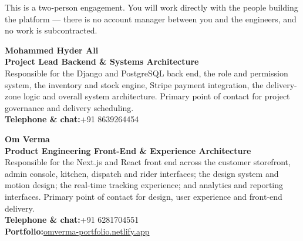 \documentclass[11pt,a4paper]{article}
\begin{document}
This is a two-person engagement. You will work directly with the people building the
platform --- there is no account manager between you and the engineers, and no work is
subcontracted.

\vspace{10pt}

\begin{tcolorbox}[enhanced,colback=brandlight,colframe=brandnavy,boxrule=0pt,leftrule=3.5pt,
  arc=0pt,outer arc=0pt,left=16pt,right=16pt,top=13pt,bottom=13pt]
{\sffamily\bfseries\color{brandnavy}\Large Mohammed Hyder Ali}\\[1pt]
{\sffamily\bfseries\color{brandaccent}Project Lead \textperiodcentered{} Backend \& Systems Architecture}\\[7pt]
Responsible for the Django and PostgreSQL back end, the role and permission system, the
inventory and stock engine, Stripe payment integration, the delivery-zone logic and
overall system architecture. Primary point of contact for project governance and
delivery scheduling.\\[8pt]
{\sffamily\bfseries\color{brandnavy}Telephone \& chat:}\quad +91 8639264454
\end{tcolorbox}

\vspace{10pt}

\begin{tcolorbox}[enhanced,colback=brandlight,colframe=brandnavy,boxrule=0pt,leftrule=3.5pt,
  arc=0pt,outer arc=0pt,left=16pt,right=16pt,top=13pt,bottom=13pt]
{\sffamily\bfseries\color{brandnavy}\Large Om Verma}\\[1pt]
{\sffamily\bfseries\color{brandaccent}Product Engineering \textperiodcentered{} Front-End \& Experience Architecture}\\[7pt]
Responsible for the Next.js and React front end across the customer storefront, admin
console, kitchen, dispatch and rider interfaces; the design system and motion design; the
real-time tracking experience; and analytics and reporting interfaces. Primary point of
contact for design, user experience and front-end delivery.\\[8pt]
{\sffamily\bfseries\color{brandnavy}Telephone \& chat:}\quad +91 6281704551\\[3pt]
{\sffamily\bfseries\color{brandnavy}Portfolio:}\quad \href{https://omverma-portfolio.netlify.app/}{omverma-portfolio.netlify.app}
\end{tcolorbox}

\vspace{14pt}
\end{document}
